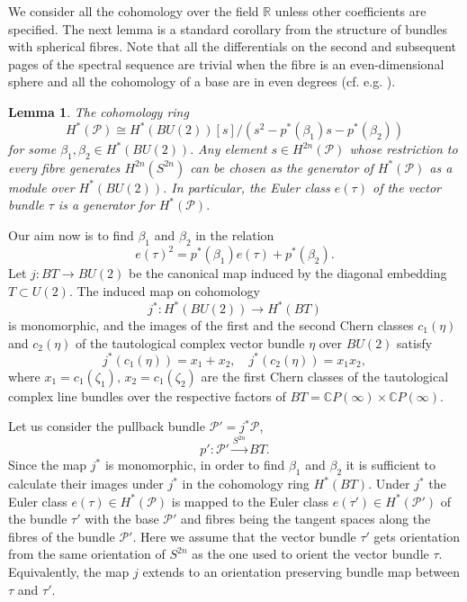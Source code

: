 \documentclass[11pt]{amsart}
\newtheorem{lemma}[theorem]{Lemma}
\theoremstyle{definition}
\theoremstyle{remark}
\numberwithin{equation}{section}
\begin{document}
We consider all the cohomology over the field $\mathbb R$ unless other coefficients are specified.  The next lemma is a standard corollary from the structure of bundles with spherical fibres. Note that all the differentials on the  second and subsequent pages of the spectral sequence are trivial 
when the fibre is an even-dimensional sphere and all the cohomology of a base are in even degrees (cf. e.g. \cite{Tu_EqCoh}).


\begin{lemma}\label{firstlem}
    The cohomology ring 
    \[
 H^*(\mathcal{P}) \cong  H^*(BU(2))[s]/\left(s^2-p^*(\beta_1)s - p^*(\beta_2)\right)
    \]
    for some $\beta_1, \beta_2 \in H^*(BU(2)).$ Any element $s \in H^{2n}(\mathcal{P})$ whose restriction to every fibre generates $H^{2n}(S^{2n})$ can be chosen as the  generator of $H^*(\mathcal{P})$ as a module over $H^*(BU(2))$. In particular, the Euler class $e(\tau)$ of the vector bundle $\tau$ is a generator for $H^*(\mathcal{P}).$
\end{lemma}

Our aim now is to find $\beta_1$ and $\beta_2$ in the relation 
\[
e(\tau)^2= p^*(\beta_1) e(\tau)+p^*(\beta_2).
\]
Let $j\colon BT \to BU(2)$ be the canonical map induced by the diagonal embedding $T \subset U(2)$. The induced map on cohomology
\[
j^*\colon H^*(BU(2)) \to H^*(BT)
\]
is monomorphic, and  the images of the first and the second Chern classes $c_1(\eta)$ and $c_2(\eta)$ of the tautological complex vector bundle $\eta$ over $BU(2)$ satisfy
$$
j^*(c_1(\eta))= x_1+x_2, \quad 
j^*(c_2(\eta))= x_1 x_2, 
$$
where $x_1=c_1(\zeta_1),\, x_2=c_1(\zeta_2)$ are the first Chern classes of the tautological complex line bundles over the respective factors of $BT=\mathbb CP(\infty)\times \mathbb CP(\infty)$.

Let us consider the pullback bundle $\mathcal{P}' = j^*\mathcal{P}$,  
\[
p'\colon \mathcal{P}'
\xrightarrow{S^{2n}} BT.
\]
Since the map $j^*$ is monomorphic, in order to find  $\beta_1$ and $\beta_2$ it is sufficient  to calculate their images under $j^*$ in the cohomology ring $H^*(BT)$. Under  $j^*$ the Euler class $e(\tau)\in H^*(\mathcal P)$ is mapped to the Euler class $e(\tau')\in H^*(\mathcal P')$ of the bundle $\tau'$ with the base $\mathcal{P}'$ and fibres being the tangent spaces along the fibres of the bundle $\mathcal{P}'$. Here we assume that the vector bundle $\tau'$ gets orientation from the same orientation of $S^{2n}$ as the one used to orient the vector bundle $\tau$. Equivalently, the map $j$ extends to an orientation preserving bundle map between $\tau$ and $\tau'$. 
\end{document}
